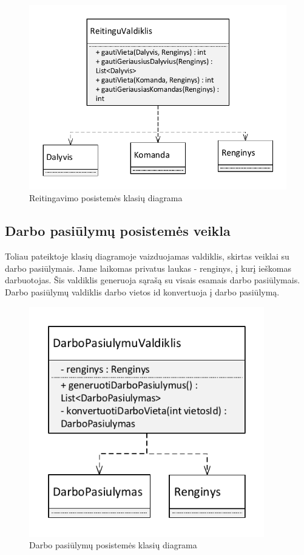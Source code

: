 \documentclass{VUMIFPSkursinis}
\begin{document}
		\begin{figure}[H]
			\centering
			\includegraphics[width=\textwidth]{img/KlasiuDiagramaReitingai}
			\caption{Reitingavimo posistemės klasių diagrama}
			\label{fig:ReitinguKlasiuDiagrama}
		\end{figure}

		\subsection*{Darbo pasiūlymų posistemės veikla}
		Toliau pateiktoje klasių diagramoje vaizduojamas valdiklis, skirtas veiklai su darbo pasiūlymais.
		Jame laikomas privatus laukas - renginys, į kurį ieškomas darbuotojas.
		Šis valdiklis generuoja sąrašą su visais esamais darbo pasiūlymais.
		Darbo pasiūlymų valdiklis darbo vietos id konvertuoja į darbo pasiūlymą.
		
		\begin{figure}[H]
			\centering
			\includegraphics[width=\textwidth, height=10cm, keepaspectratio]{img/KlasiuDiagramaDarboPasiulymai}
			\caption{Darbo pasiūlymų posistemės klasių diagrama}
			\label{fig:DarboPasiulymuDiagrama}
		\end{figure}
		
\end{document}
